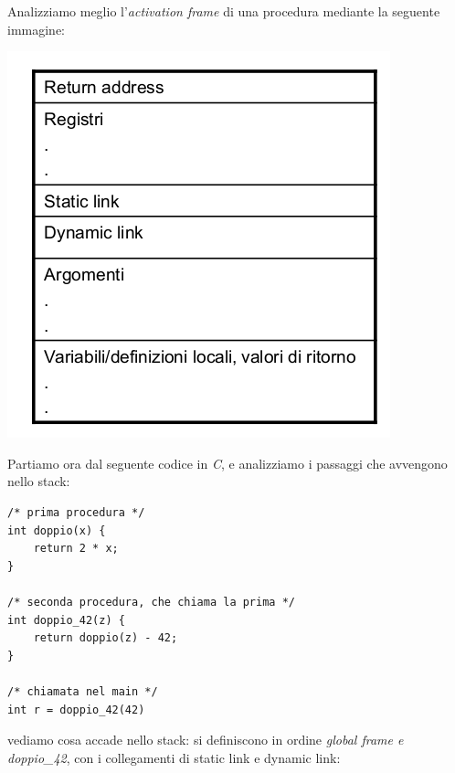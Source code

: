 \documentclass[a4paper,12pt, oneside]{book}
\begin{document}
Analizziamo meglio l'\textit{activation frame} di una procedura mediante la seguente immagine:
\begin{center}
\includegraphics[scale=0.6]{img/act.png}
\end{center}
\newpage
Partiamo ora dal seguente codice in \textit{C}, e analizziamo i passaggi che avvengono nello stack:
\begin{verbatim}
/* prima procedura */
int doppio(x) { 
	return 2 * x; 
}

/* seconda procedura, che chiama la prima */
int doppio_42(z) { 
	return doppio(z) - 42; 
}

/* chiamata nel main */
int r = doppio_42(42)
\end{verbatim} 
vediamo cosa accade nello stack:
si definiscono in ordine \textit{global frame e doppio\_42}, con i collegamenti di static link e dynamic link:
\end{document}
